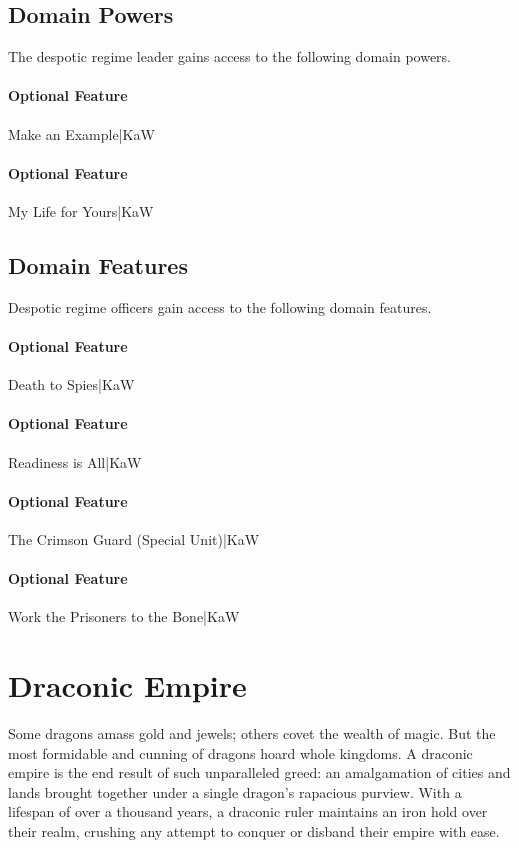 \documentclass[10pt,a4paper,twoside,bg=print,twocolumn,openany,nodeprecatedcode]{dndbook}
\begin{document}
\subsection{Domain Powers}
The despotic regime leader gains access to the following domain powers.

\paragraph{Optional Feature}
Make an Example|KaW

\paragraph{Optional Feature}
My Life for Yours|KaW

\subsection{Domain Features}
Despotic regime officers gain access to the following domain features.

\paragraph{Optional Feature}
Death to Spies|KaW

\paragraph{Optional Feature}
Readiness is All|KaW

\paragraph{Optional Feature}
The Crimson Guard (Special Unit)|KaW

\paragraph{Optional Feature}
Work the Prisoners to the Bone|KaW

\section{Draconic Empire}
Some dragons amass gold and jewels; others covet the wealth of magic. But the most formidable and cunning of dragons hoard whole kingdoms. A draconic empire is the end result of such unparalleled greed: an amalgamation of cities and lands brought together under a single dragon's rapacious purview. With a lifespan of over a thousand years, a draconic ruler maintains an iron hold over their realm, crushing any attempt to conquer or disband their empire with ease.
\end{document}
